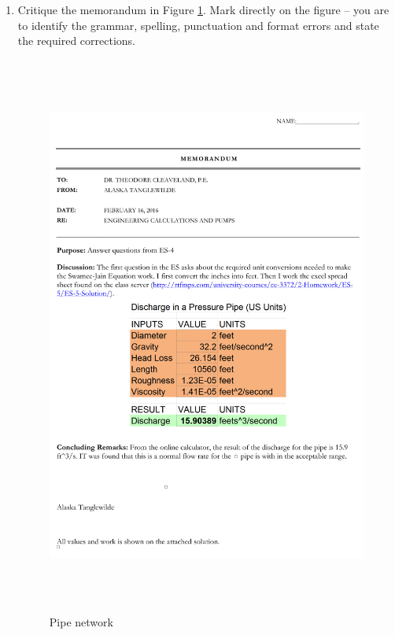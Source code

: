 \documentclass[11pt]{article}
\begin{document}
\begin{enumerate}
\item Critique the memorandum in Figure \ref{fig:memorandum}.  Mark directly on the figure -- you are to identify the grammar, spelling, punctuation and format errors and state the required corrections.

\begin{figure}[h!] %
\centering
   \includegraphics[height=7.3in]{Exam-1-Memo.jpg}
   \caption{Pipe network}
   \label{fig:memorandum} 
\end{figure}


\end{enumerate}
\end{document}
